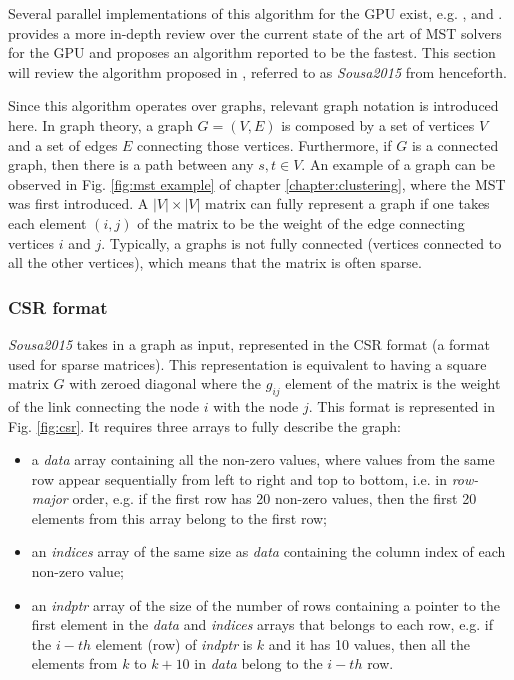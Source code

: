 Several parallel implementations of this algorithm for the GPU exist, e.g. \citep{Vineet2009}, \cite{harish2009large} and \citep{Sousa2015}. \citet{Sousa2015} provides a more in-depth review over the current state of the art of MST solvers for the GPU and proposes an algorithm reported to be the fastest.
This section will review the algorithm proposed in \citep{Sousa2015}, referred to as \emph{Sousa2015} from henceforth.

Since this algorithm operates over graphs, relevant graph notation is introduced here.
In graph theory, a graph $G = (V,E)$ is composed by a set of vertices $V$ and a set of edges $E$ connecting those vertices.
Furthermore, if $G$ is a connected graph, then there is a path between any $s,t \in V$.
An example of a graph can be observed in Fig. \ref{fig:mst example} of chapter \ref{chapter:clustering}, where the MST was first introduced.
A $|V| \times |V|$ matrix can fully represent a graph if one takes each element $(i,j)$ of the matrix to be the weight of the edge connecting vertices $i$ and $j$.
Typically, a graphs is not fully connected (vertices connected to all the other vertices), which means that the matrix is often sparse.

\subsubsection{CSR format}
\emph{Sousa2015} takes in a graph as input, represented in the CSR format (a format used for sparse matrices).
This representation is equivalent to having a square matrix $G$ with zeroed diagonal where the $g_{ij}$ element of the matrix is the weight of the link connecting the node $i$ with the node $j$.
This format is represented in Fig. \ref{fig:csr}.
It requires three arrays to fully describe the graph:

\begin{itemize}
	\item a \emph{data} array containing all the non-zero values, where values from the same row appear sequentially from left to right and top to bottom, i.e. in \emph{row-major} order, e.g. if the first row has 20 non-zero values, then the first 20 elements from this array belong to the first row;
	\item an \emph{indices} array of the same size as \emph{data} containing the column index of each non-zero value;
	\item an \emph{indptr} array of the size of the number of rows containing a pointer to the first element in the \emph{data} and \emph{indices} arrays that belongs to each row, e.g. if the $i-th$ element (row) of \emph{indptr} is $k$ and it has 10 values, then all the elements from $k$ to $k + 10$ in \emph{data} belong to the $i-th$ row.
\end{itemize}

